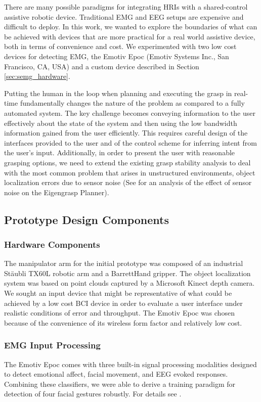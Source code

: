  There are many possible paradigms for integrating HRIs with a shared-control assistive robotic device. Traditional EMG and EEG setups are expensive and difficult to deploy. In this work, we wanted to explore the boundaries of what can be achieved with devices that are more practical for a real world assistive device, both in terms of convenience and cost. We experimented with two low cost devices for detecting EMG, the Emotiv Epoc (Emotiv Systems Inc., San Francisco, CA, USA) and a custom device described in Section \ref{sec:semg_hardware}. 

Putting the human in the loop when planning and executing the grasp in real-time fundamentally changes the nature of the problem as compared to a fully automated system. The key challenge becomes conveying information to the user effectively about the state of the system and then using the low bandwidth information gained from the user efficiently. This requires careful design of the interfaces provided to the user and of the control scheme for inferring intent from the user's input. Additionally, in order to present the user with reasonable grasping options, we need to extend the existing grasp stability analysis to deal with the most common problem that arises in unstructured environments, object localization errors due to sensor noise (See \cite{Weisz2012} for an analysis of the effect of sensor noise on the Eigengrasp Planner). 

\subsection{Prototype Design Components}
\subsubsection*{Hardware Components}The manipulator arm for the initial prototype was composed of an industrial St\"{a}ubli TX60L robotic arm and a BarrettHand gripper. The object localization system was based on point clouds captured by a Microsoft Kinect depth camera. We sought an input device that might be representative of what could be achieved by a low cost BCI device in order to evaluate a user interface under realistic conditions of error and throughput. The Emotiv Epoc was chosen because of the convenience of its wireless form factor and relatively low cost. 

\subsubsection*{EMG Input Processing}
The Emotiv Epoc comes with three built-in signal processing modalities designed to detect emotional affect, facial movement, and EEG evoked responses. Combining these classifiers, we were able to derive a training paradigm for detection of four facial gestures robustly. For details see \cite{Weisz2013}.

